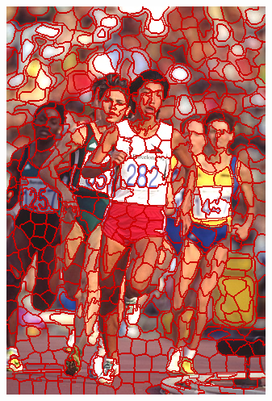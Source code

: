 \begin{figure}
{		\includegraphics[scale=\scalefivebsdtest]{pictures/bsd-test-8-orislic}
	}
	\subfigure{
}
\end{figure}
